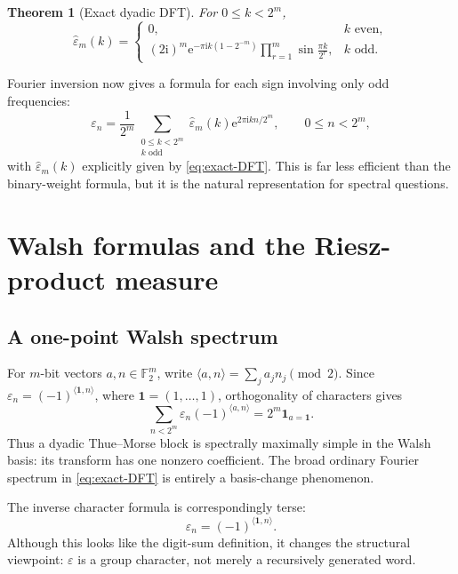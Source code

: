 \documentclass[11pt,oneside]{article}
\newtheorem{theorem}{Theorem}[section]
\theoremstyle{definition}
\theoremstyle{remark}
\newcommand{\e}{\mathrm e}
\newcommand{\ii}{\mathrm i}
\newcommand{\eps}{\varepsilon}
\newcommand{\ind}{\mathbf 1}
\begin{document}
\begin{theorem}[Exact dyadic DFT]
For \(0\le k<2^m\),
\begin{equation}
  \boxed{
  \widehat\eps_m(k)=
  \begin{cases}
    0,&k\text{ even},\\[0.4em]
    (2\ii)^m\e^{-\pi\ii k(1-2^{-m})}
      \displaystyle\prod_{r=1}^{m}
      \sin\frac{\pi k}{2^r},&k\text{ odd}.
  \end{cases}}
  \label{eq:exact-DFT}
\end{equation}
\end{theorem}

Fourier inversion now gives a formula for each sign involving only odd
frequencies:
\begin{equation}
  \boxed{
  \eps_n=\frac1{2^m}
  \sum_{\substack{0\le k<2^m\\k\text{ odd}}}
    \widehat\eps_m(k)\e^{2\pi\ii kn/2^m},
  \qquad 0\le n<2^m,}
  \label{eq:DFT-inversion}
\end{equation}
with \(\widehat\eps_m(k)\) explicitly given by
\eqref{eq:exact-DFT}.  This is far less efficient than the binary-weight
formula, but it is the natural representation for spectral questions.

\section{Walsh formulas and the Riesz-product measure}
\label{sec:walsh-riesz}

\subsection{A one-point Walsh spectrum}
\label{sec:walsh}

For \(m\)-bit vectors \(a,n\in\mathbb F_2^m\), write
\(\langle a,n\rangle=\sum_ja_jn_j\pmod2\).  Since
\(\eps_n=(-1)^{\langle\bm1,n\rangle}\), where
\(\bm1=(1,\ldots,1)\), orthogonality of characters gives
\begin{equation}
  \boxed{
  \sum_{n<2^m}\eps_n(-1)^{\langle a,n\rangle}
   =2^m\ind_{a=\bm1}.}
  \label{eq:Walsh-spike}
\end{equation}
Thus a dyadic Thue--Morse block is spectrally maximally simple in the Walsh
basis: its transform has one nonzero coefficient.  The broad ordinary Fourier
spectrum in \eqref{eq:exact-DFT} is entirely a basis-change phenomenon.

The inverse character formula is correspondingly terse:
\begin{equation}
  \eps_n=(-1)^{\langle\bm1,n\rangle}.
  \label{eq:Walsh-character}
\end{equation}
Although this looks like the digit-sum definition, it changes the structural
viewpoint: \(\eps\) is a group character, not merely a recursively generated
word.
\end{document}
